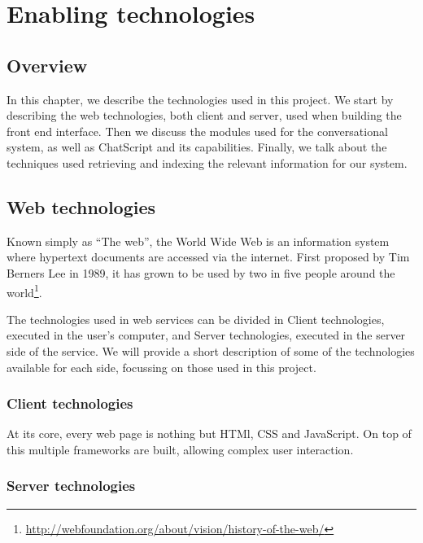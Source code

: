 \chapter{Enabling technologies}
\label{chap:enabling}

\section{Overview}

In this chapter, we describe the technologies used in this project. We start by describing the web technologies, both client and server, used when building the front end interface. Then we discuss the modules used for the conversational system, as well as ChatScript and its capabilities. Finally, we talk about the techniques used retrieving and indexing the relevant information for our system.

\section{Web technologies}



Known simply as ``The web'', the World Wide Web is an information system where hypertext documents are accessed via the internet. First proposed by Tim Berners Lee in 1989\cite{berners1989information}, it has grown to be used by two in five people around the world\footnote{\url{http://webfoundation.org/about/vision/history-of-the-web/}}.

The technologies used in web services can be divided in Client technologies, executed in the user's computer, and Server technologies, executed in the server side of the service. We will provide a short description of some of the technologies available for each side, focussing on those used in this project.
\subsection{Client technologies}

At its core, every web page is nothing but HTMl, CSS and JavaScript. On top of this multiple frameworks are built, allowing complex user interaction. 


\subsection{Server technologies}

